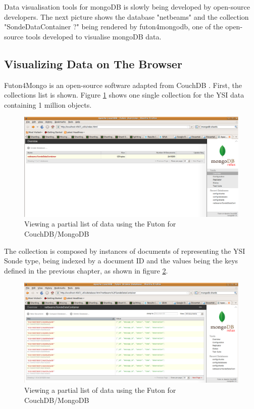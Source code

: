 Data visualisation tools for mongoDB is slowly being developed by open-source
developers. The next picture shows the database "netbeams" and the collection
"SondeDataContainer  ?" being rendered by futon4mongodb, one of the
open-source tools developed to visualise mongoDB data.

\subsection{Visualizing Data on The Browser}

Futon4Mongo is an open-source software adapted from CouchDB \cite{couchdb}.
First, the collections list is shown. Figure
\ref{fig:view-collections-instance-browser-futondb} shows one single collection
for the YSI data containing 1 million objects.

\begin{figure}[h]
  \centering
  \includegraphics[scale=0.5]{../diagrams/view-collections-instance-browser-futondb}
  \caption{Viewing a partial list of data using the Futon for CouchDB/MongoDB}
  \label{fig:view-collections-instance-browser-futondb}
\end{figure}

The collection is composed by instances of documents of representing the YSI
Sonde type, being indexed by a document ID and the values being the keys
defined in the previous chapter, as shown in figure
\ref{fig:view-collected-data-list-browser-futondb}.

\begin{figure}[h]
  \centering
  \includegraphics[scale=0.5]{../diagrams/view-collected-data-list-browser-futondb}
  \caption{Viewing a partial list of data using the Futon for CouchDB/MongoDB}
  \label{fig:view-collected-data-list-browser-futondb}
\end{figure}

